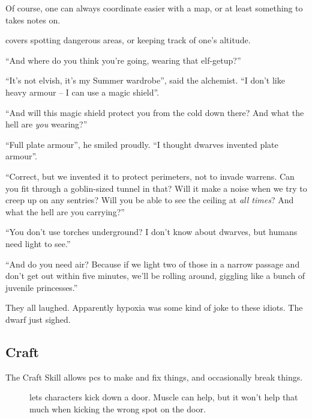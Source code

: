 \begin{multicols}{2}
\begin{description}
    Of course, one can always coordinate easier with a map, or at least something to takes notes on.
  \item[\roll{Wits}{Caving}]
    covers spotting dangerous areas, or keeping track of one's altitude.
\end{description}

\begin{exampletext}

  ``And where do you think you're going, wearing that elf-getup?''

  ``It's not elvish, it's my Summer wardrobe'', said the alchemist.
  ``I don't like heavy armour -- I can use a magic shield''.

  ``And will this magic shield protect you from the cold down there?
  And what the hell are \emph{you} wearing?''

  ``Full plate armour'', he smiled proudly.
  ``I thought dwarves invented plate armour''.

  ``Correct, but we invented it to protect perimeters, not to invade warrens.
  Can you fit through a goblin-sized tunnel in that?
  Will it make a noise when we try to creep up on any sentries?
  Will you be able to see the ceiling at \emph{all times}?
  And what the hell are you carrying?''

  ``You don't use torches underground?
  I don't know about dwarves, but humans need light to see.''

  ``And do you need air?
  Because if we light two of those in a narrow passage and don't get out within five minutes, we'll be rolling around, giggling like a bunch of juvenile princesses.''

  They all laughed.
  Apparently hypoxia was some kind of joke to these idiots.
  The dwarf just sighed.
  
\end{exampletext}

\subsection{Craft}

The Craft Skill allows \glspl{pc} to make and fix things, and occasionally break things.

\begin{description}
  \item[]
    lets characters kick down a door.
    Muscle can help, but it won't help that much when kicking the wrong spot on the door.


\end{description}
\end{multicols}
